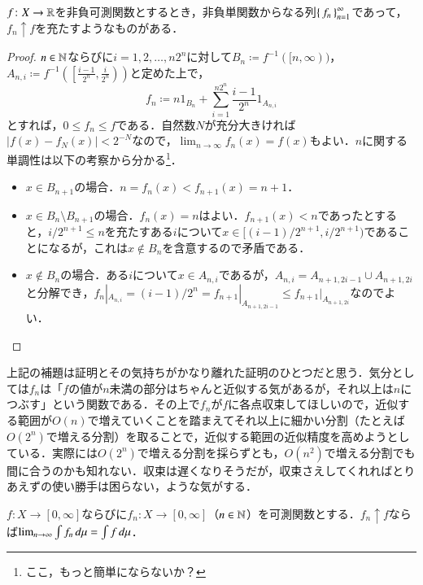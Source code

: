 \begin{lem}\label{非負単関数の列}
$f \colon X \to \mathbb{R}$を非負可測関数とするとき，非負単関数からなる列$\set{f_n}_{n=1}^\infty$であって，$f_n \uparrow f$を充たすようなものがある．
\end{lem}

\begin{proof}
$n \in \mathbb{N}$ならびに$i = 1,2,\dots, n2^n$に対して$B_n \coloneqq f^{-1}([n,\infty))$，$A_{n,i} \coloneqq f^{-1}\left(\left[\frac{i-1}{2^n},\frac{i}{2^n}\right)\right)$と定めた上で，
\begin{equation}
f_n \coloneqq n 1_{B_n} + \sum_{i=1}^{n2^n} \frac{i-1}{2^n} 1_{A_{n,i}}
\end{equation}とすれば，$0 \leq f_n \leq f$である．自然数$N$が充分大きければ$|f(x) - f_N(x)| < 2^{-N}$なので，$\lim_{n \to \infty}f_n(x)=f(x)$もよい．$n$に関する単調性は以下の考察から分かる\footnote{ここ，もっと簡単にならないか？}．
\begin{itemize}
\item $x \in B_{n+1}$の場合．$n = f_n(x) < f_{n+1}(x) = n+1$．
\item $x \in B_{n} \setminus B_{n+1}$の場合．$f_n(x)=n$はよい．$f_{n+1}(x) < n$であったとすると，$i /2^{n+1} \leq n$を充たすある$i$について$x \in [(i-1)/2^{n+1}, i/2^{n+1})$であることになるが，これは$x \notin B_n$を含意するので矛盾である．
\item $x \notin B_n$の場合．ある$i$について$x \in A_{n,i}$であるが，$A_{n,i} = A_{n+1, 2i-1} \cup A_{n+1, 2i}$と分解でき，$f_n|_{A_{n,i}} = (i-1)/2^n = f_{n+1}|_{A_{n+1,2i-1}} \leq f_{n+1}|_{A_{n+1,2i}}$なのでよい．
\end{itemize}
\end{proof}

\begin{dig}
上記の補題は証明とその気持ちがかなり離れた証明のひとつだと思う．気分としては$f_n$は「$f$の値が$n$未満の部分はちゃんと近似する気があるが，それ以上は$n$につぶす」という関数である．その上で$f_n$が$f$に各点収束してほしいので，近似する範囲が$O(n)$で増えていくことを踏まえてそれ以上に細かい分割（たとえば$O(2^n)$で増える分割）を取ることで，近似する範囲の近似精度を高めようとしている．実際には$O(2^n)$で増える分割を採らずとも，$O(n^2)$で増える分割でも間に合うのかも知れない．収束は遅くなりそうだが，収束さえしてくれればとりあえずの使い勝手は困らない，ような気がする．
\end{dig}

\begin{thm}
$f \colon X \to [0,\infty]$ならびに$f_n \colon X \to [0,\infty]$（$n \in \mathbb{N}$）を可測関数とする．$f_n \uparrow f$ならば$\lim_{n \to \infty} \int f_n \mathop{}\!d \mu = \int f \mathop{}\!d \mu$．
\end{thm}

